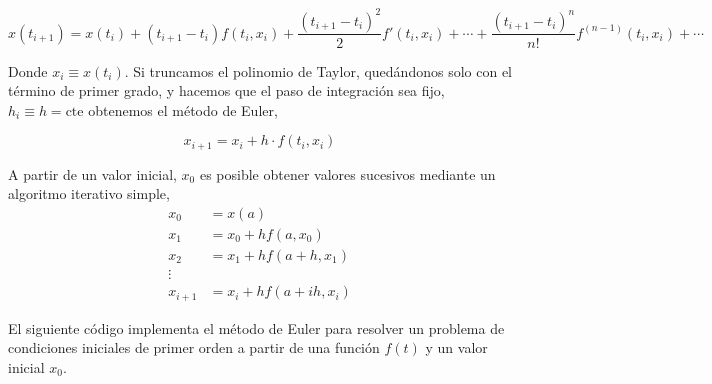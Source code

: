 \begin{equation*}
x(t_{i+1})=x(t_i)+(t_{i+1}-t_{i})f(t_i,x_i)+\frac{(t_{i+1}-t_{i})^2}{2}f'(t_i,x_i)+\cdots+ \frac{(t_{i+1}-t_i)^n}{n!}f^{(n-1)}(t_i,x_i)+\cdots
\end{equation*}

Donde $x_i\equiv x(t_i)$. Si truncamos el polinomio de Taylor, quedándonos solo con el término de primer grado, y hacemos que el paso de integración sea fijo, $h_i\equiv h=\mathrm{cte}$ obtenemos el método de Euler,

\begin{equation*}
x_{i+1}=x_i+h\cdot f(t_i,x_i)
\end{equation*}

A partir de un valor inicial, $x_0$ es posible obtener valores sucesivos mediante un algoritmo iterativo simple,
\begin{align*}
x_0&=x(a)\\
x_1&=x_0+hf(a,x_0)\\
x_2&=x_1+hf(a+h,x_1)\\
\vdots \\
x_{i+1}&=x_i+hf(a+ih,x_i)
\end{align*}

El siguiente código implementa el método de Euler para resolver un problema de condiciones iniciales de primer orden a partir de una función $f(t)$ y un valor inicial $x_0$.

%

